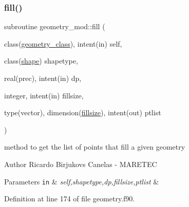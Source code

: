 \subsubsection{\texorpdfstring{fill()}{fill()}}
{\footnotesize\ttfamily subroutine geometry\+\_\+mod\+::fill (\begin{DoxyParamCaption}\item[{class(\mbox{\hyperlink{structgeometry__mod_1_1geometry__class}{geometry\+\_\+class}}), intent(in)}]{self,  }\item[{class(\mbox{\hyperlink{structgeometry__mod_1_1shape}{shape}})}]{shapetype,  }\item[{real(prec), intent(in)}]{dp,  }\item[{integer, intent(in)}]{fillsize,  }\item[{type(vector), dimension(\mbox{\hyperlink{namespacegeometry__mod_ad790edd694561b33dad20cfa3a14e8f2}{fillsize}}), intent(out)}]{ptlist }\end{DoxyParamCaption})\hspace{0.3cm}{\ttfamily [private]}}



method to get the list of points that fill a given geometry 

\begin{DoxyAuthor}{Author}
Ricardo Birjukovs Canelas -\/ M\+A\+R\+E\+T\+EC 
\end{DoxyAuthor}

\begin{DoxyParams}[1]{Parameters}
\mbox{\tt in}  & {\em self,shapetype,dp,fillsize,ptlist} & \\
\hline
\end{DoxyParams}


Definition at line 174 of file geometry.\+f90.


